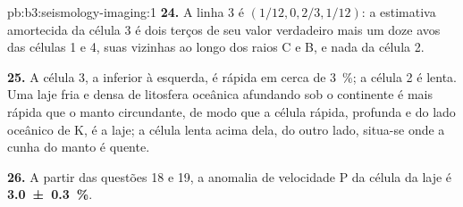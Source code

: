 \begin{solution}{pb:b3:seismology-imaging:1}
\textbf{24.} A linha 3 é $(1/12, 0, 2/3, 1/12)$: a estimativa amortecida da célula 3 é
dois terços de seu valor verdadeiro mais um doze avos das células 1 e 4, suas vizinhas
ao longo dos raios C e B, e nada da célula 2.

\textbf{25.} A célula 3, a inferior à esquerda, é rápida em cerca de
\qty{3}{\percent}; a célula 2 é lenta. Uma laje fria e densa de litosfera oceânica
afundando sob o continente é mais rápida que o manto circundante, de modo que a
célula rápida, profunda e do lado oceânico de K, é a laje; a célula lenta acima
dela, do outro lado, situa-se onde a cunha do manto é quente.

\textbf{26.} A partir das questões 18 e 19, a anomalia de velocidade P da célula da laje é
\textbf{\qty[text-series-to-math=true, uncertainty-mode=separate]{3.0 \pm 0.3}{\percent}}.
\end{solution}
